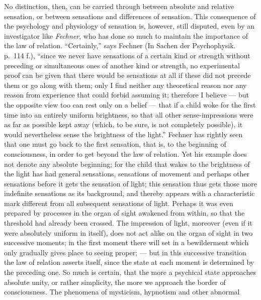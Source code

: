 \documentclass[12pt,a4paper]{book}
\newcommand{\opage}[1]{\marginnote{\footnotesize\textit{[#1]}}}
\begin{document}
No distinction, then, can be carried through between absolute and
relative sensation, or between sensations and differences of sensation.
This consequence of the psychology and physiology of sensation is,
however, still disputed, even by an investigator like \emph{Fechner},
who has done so much to maintain the importance of the law of relation.
``Certainly,'' says Fechner (In Sachen der Psychophysik. p.~114 f.),
``since we never have sensations of a certain kind or strength without
preceding or simultaneous ones of another kind or strength, no
experimental proof can be given that there would be sensations at all if
these did not precede them or go along with them; only I find neither
any theoretical reason nor any reason from experience that could forbid
assuming it; therefore I believe --- but the opposite view too can rest
only on a belief --- that if a child woke for the first time into an
entirely uniform brightness, so that all other sense-impressions were as
far as possible kept away (which, to be sure, is not completely
possible), it would nevertheless sense the brightness of the light.''
Fechner has rightly seen that one must go back to the first sensation,
that is, to the beginning of consciousness, in order to get beyond the
law of relation. Yet his example does not denote any absolute
beginning; for the child that wakes to the brightness of the light has
had general sensations, sensations of movement and perhaps other
sensations before it gets the sensation of light; this sensation thus
gets those more indefinite sensations as its background, and thereby
appears with a characteristic mark different from all subsequent
\opage{143}sensations of light. Perhaps it was even prepared by processes
in the organ of sight awakened from within, so that the threshold had
already been crossed. The impression of light, moreover (even if it were
absolutely uniform in itself), does not act alike on the organ of sight
in two successive moments; in the first moment there will set in a
bewilderment which only gradually gives place to seeing proper; --- but
in this successive transition the law of relation asserts itself, since
the state at each moment is determined by the preceding one. So much is
certain, that the more a psychical state approaches absolute unity, or
rather simplicity, the more we approach the border of consciousness. The
phenomena of mysticism, hypnotism and other abnormal
\end{document}
